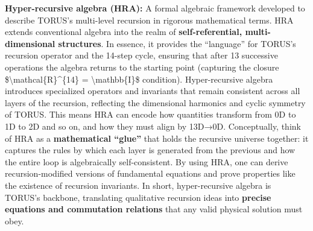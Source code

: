 \documentclass[
]{article}
\begin{document}
\textbf{Hyper-recursive algebra (HRA):} A formal algebraic framework
developed to describe TORUS's multi-level recursion in rigorous
mathematical terms. HRA extends conventional algebra into the realm of
\textbf{self-referential, multi-dimensional structures}\hspace{0pt}. In
essence, it provides the ``language'' for TORUS's recursion operator and
the 14-step cycle, ensuring that after 13 successive operations the
algebra returns to the starting point (capturing the closure
\$\textbackslash mathcal\{R\}\^{}\{14\} = \textbackslash mathbb\{I\}\$
condition)\hspace{0pt}. Hyper-recursive algebra introduces specialized
operators and invariants that remain consistent across all layers of the
recursion, reflecting the dimensional harmonics and cyclic symmetry of
TORUS\hspace{0pt}. This means HRA can encode how quantities transform
from 0D to 1D to 2D and so on, and how they must align by 13D→0D.
Conceptually, think of HRA as a \textbf{mathematical ``glue''} that
holds the recursive universe together: it captures the rules by which
each layer is generated from the previous and how the entire loop is
algebraically self-consistent. By using HRA, one can derive
recursion-modified versions of fundamental equations and prove
properties like the existence of recursion invariants. In short,
hyper-recursive algebra is TORUS's backbone, translating qualitative
recursion ideas into \textbf{precise equations and commutation
relations} that any valid physical solution must obey.
\end{document}
